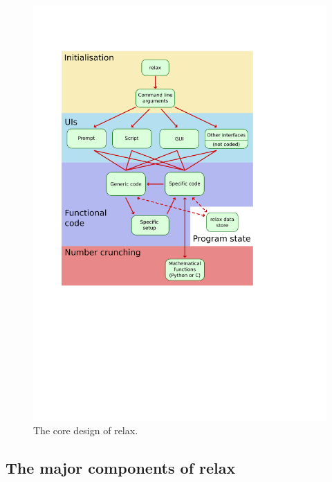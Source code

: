 \begin{figure}
\centerline{\includegraphics[width=\textwidth, bb=0 -1 389 476]{images/core_design}}
\caption{The core design of relax.} \label{fig: core design}
\end{figure}



\subsection{The major components of relax}

